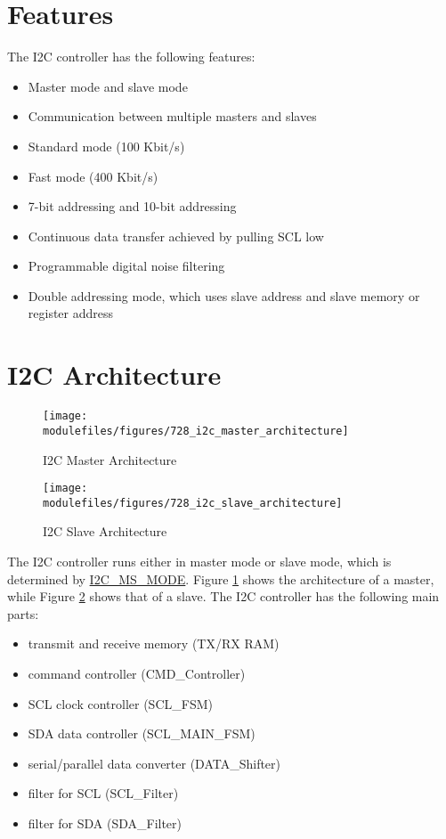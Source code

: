 \documentclass[main\_\_EN.tex]{subfiles}
\begin{document}
\section{Features}

The I2C controller has the following features:

\begin{itemize}
    \item Master mode and slave mode
    \item Communication between multiple masters and slaves
    \item Standard mode (100 Kbit/s)
    \item Fast mode (400 Kbit/s)
    \item 7-bit addressing and 10-bit addressing
    \item Continuous data transfer achieved by pulling SCL low
    \item Programmable digital noise filtering
    \item Double addressing mode, which uses slave address and slave memory or register address
\end{itemize}


\section{I2C Architecture}
\begin{figure}[H]
    \centering
    \texttt{[image: \\modulefiles/figures/728\_i2c\_master\_architecture]}
    \caption{I2C Master Architecture}
    \label{fig:i2c-master}
\end{figure}

\begin{figure}[H]
    \centering
    \texttt{[image: \\modulefiles/figures/728\_i2c\_slave\_architecture]}
    \caption{I2C Slave Architecture}
    \label{fig:i2c-slave}
\end{figure}

The I2C controller runs either in master mode or slave mode, which is determined by \hyperref[fielddesc:I2CMSMODE]{I2C\_MS\_MODE}. Figure \ref{fig:i2c-master} shows the architecture of a master, while Figure \ref{fig:i2c-slave} shows that of a slave. The I2C controller has the following main parts:
\begin{itemize}
    \item transmit and receive memory (TX/RX RAM)
    \item command controller (CMD\_Controller)
    \item SCL clock controller (SCL\_FSM)
    \item SDA data controller (SCL\_MAIN\_FSM)
    \item serial/parallel data converter (DATA\_Shifter)
    \item filter for SCL (SCL\_Filter)
    \item filter for SDA (SDA\_Filter)
\end{itemize}
\end{document}
